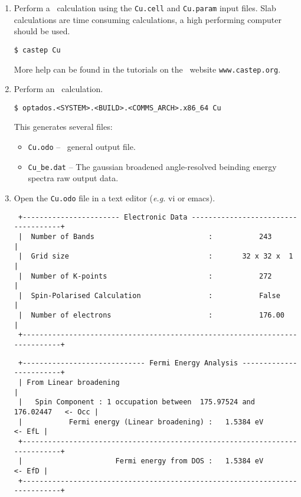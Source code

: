 \documentclass[a4paper,11pt,twoside]{book}
\begin{document}
\begin{enumerate}
\item Perform a \castep\ calculation using the  \verb#Cu.cell#  and \verb#Cu.param# input files. Slab calculations are time consuming calculations, a high performing computer should be used.

  \verb#$ castep Cu# 

More help can be found in  the tutorials  on  the \castep\ website \verb#www.castep.org#.  

\item Perform an \optados\ calculation.
 
\verb#$ optados.<SYSTEM>.<BUILD>.<COMMS_ARCH>.x86_64 Cu# 

This generates several files:
\begin{itemize}
\item \verb#Cu.odo# -- \optados\ general output file.
\item \verb#Cu_be.dat# -- The gaussian broadened angle-resolved beinding energy spectra raw output data.
\end{itemize}

\item Open the \verb#Cu.odo# file in a text editor (\emph{e.g.} vi or emacs).

\begin{verbatim}
 +----------------------- Electronic Data ------------------------------------+
 |  Number of Bands                           :           243                 |
 |  Grid size                                 :       32 x 32 x  1            |
 |  Number of K-points                        :           272                 |
 |  Spin-Polarised Calculation                :           False               |
 |  Number of electrons                       :           176.00              |
 +----------------------------------------------------------------------------+
\end{verbatim}



\begin{verbatim}
 +----------------------------- Fermi Energy Analysis ------------------------+
 | From Linear broadening                                                     |
 |   Spin Component : 1 occupation between  175.97524 and  176.02447   <- Occ |
 |           Fermi energy (Linear broadening) :   1.5384 eV            <- EfL |
 +----------------------------------------------------------------------------+
 |                      Fermi energy from DOS :   1.5384 eV            <- EfD |
 +----------------------------------------------------------------------------+


\end{verbatim}
\end{enumerate}
\end{document}
